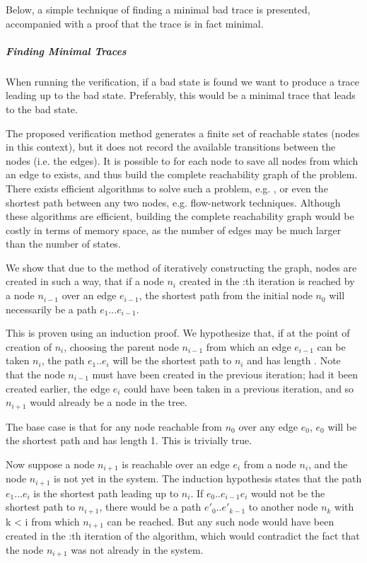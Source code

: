 Below, a simple technique of finding a minimal bad trace is presented, accompanied with a proof that the trace is in fact minimal.

\subparagraph{Finding Minimal Traces}
When running the verification, if a bad state is found we want to produce a trace leading up to the bad state. Preferably, this would be a minimal trace that leads to the bad state.
 
The proposed verification method generates a finite set of reachable states (nodes in this context), but it does not record the available transitions between the nodes (i.e. the edges). It is possible to for each node  to save all nodes  from which an edge to  exists, and thus build the complete reachability graph of the problem. There exists efficient algorithms to solve such a problem, e.g. , or even the shortest path between any two nodes, e.g. flow-network techniques. Although these algorithms are efficient, building the complete reachability graph would be costly in terms of memory space, as the number of edges may be much larger than the number of states.

 
We show that due to the method of iteratively constructing the graph, nodes are created in such a way, that if a node $n_{i}$ created in the :th iteration is reached by a node $n_{i-1}$ over an edge $e_{i-1}$, the shortest path from the initial node $n_0$ will necessarily be a path $e_1...e_{i-1}$.
 
 This is proven using an induction proof. We hypothesize that, if at the point of creation of $n_i$, choosing the parent node $n_{i-1}$ from which an edge $e_{i-1}$ can be taken $n_i$, the path $e_1..e_{i}$ will be the shortest path to $n_i$ and has length . Note that the node $n_{i-1}$ must have been created in the previous iteration; had it been created earlier, the edge $e_i$ could have been taken in a previous iteration, and so $n_{i+1}$ would already be a node in the tree.
 
The base case is that for any node reachable from $n_0$ over any edge $e_0$, $e_0$ will be the shortest path and has length 1. This is trivially true.
 
Now suppose a node $n_{i+1}$ is reachable over an edge $e_i$ from a node $n_i$, and the node $n_{i+1}$ is not yet in the system. The induction hypothesis states that the path $e_1...e_i$ is the shortest path leading up to $n_i$. If $e_0..e_{i-1}e_i$ would not be the shortest path to $n_{i+1}$, there would be a path $e'_0..e'_{k-1}$ to another node $n_k$ with k < i from which $n_{i+1}$ can be reached. But any such node would have been created in the :th iteration of the algorithm, which would contradict the fact that the node $n_{i+1}$ was not already in the system.
 
